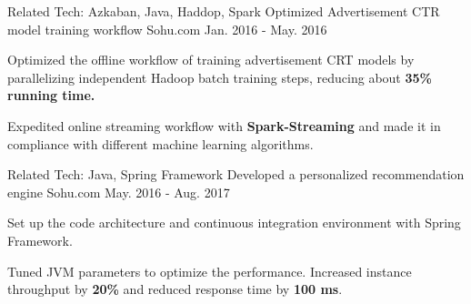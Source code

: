\begin{cventries}
  \cventrynew
    {Related Tech: Azkaban, Java, Haddop, Spark} %
    {Optimized Advertisement CTR model training workflow} %
    {Sohu.com} %
    {Jan. 2016 - May. 2016} %
    {
      \begin{cvitems} %
        \item {Optimized the offline workflow of training advertisement CRT models by parallelizing independent Hadoop batch training steps, reducing about \textbf{35\% running time.}}
        \item {Expedited online streaming workflow with \textbf{Spark-Streaming} and made it in compliance with different machine learning algorithms.}
      \end{cvitems}
    }


  \cventrynew
    {Related Tech: Java, Spring Framework} %
    {Developed a personalized recommendation engine} %
    {Sohu.com} %
    {May. 2016 - Aug. 2017} %
    {
      \begin{cvitems} %
        \item {Set up the code architecture and continuous integration environment with Spring Framework.}
        \item {Tuned JVM parameters to optimize the performance. Increased instance throughput by \textbf{20\%} and reduced response time by \textbf{100 ms}.}
      \end{cvitems}
    } 
\end{cventries}
